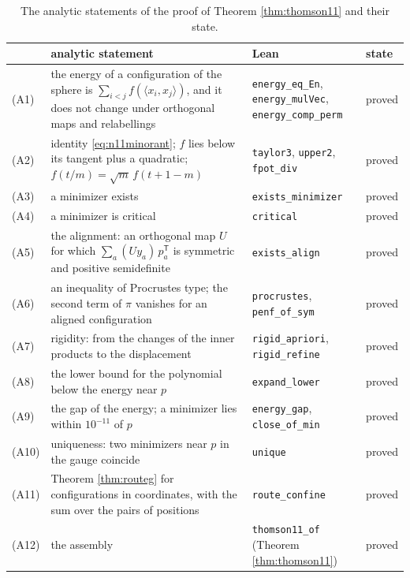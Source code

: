 \documentclass[reqno,a4paper,11pt]{amsart}
\numberwithin{equation}{section}
\newcommand{\lean}[1]{\texttt{#1}}
\begin{document}
\begin{table}[ht]
\centering
\small
\begin{tabular}{@{}lp{}p{}p{}@{}}
\toprule
 & analytic statement & Lean & state \\
\midrule
(A1) & the energy of a configuration of the sphere is $\sum_{i<j} f(\langle x_i, x_j \rangle)$, and it does not change under orthogonal maps and relabellings & \lean{energy\_eq\_En}, \newline \lean{energy\_mulVec}, \newline \lean{energy\_comp\_perm} & proved \\
(A2) & identity \eqref{eq:n11minorant}; $f$ lies below its tangent plus a quadratic; $f(t/m) = \sqrt{m} \, f(t + 1 - m)$ & \lean{taylor3}, \lean{upper2}, \newline \lean{fpot\_div} & proved \\
(A3) & a minimizer exists & \lean{exists\_minimizer} & proved \\
(A4) & a minimizer is critical & \lean{critical} & proved \\
(A5) & the alignment: an orthogonal map $U$ for which $\sum_a (U y_a) \, p_a^{\mathsf T}$ is symmetric and positive semidefinite & \lean{exists\_align} & proved \\
(A6) & an inequality of Procrustes type; the second term of $\pi$ vanishes for an aligned configuration & \lean{procrustes}, \newline \lean{penf\_of\_sym} & proved \\
(A7) & rigidity: from the changes of the inner products to the displacement & \lean{rigid\_apriori}, \newline \lean{rigid\_refine} & proved \\
(A8) & the lower bound for the polynomial below the energy near $p$ & \lean{expand\_lower} & proved \\
(A9) & the gap of the energy; a minimizer lies within $10^{-11}$ of $p$ & \lean{energy\_gap}, \newline \lean{close\_of\_min} & proved \\
(A10) & uniqueness: two minimizers near $p$ in the gauge coincide & \lean{unique} & proved \\
(A11) & Theorem \ref{thm:routeg} for configurations in coordinates, with the sum over the pairs of positions & \lean{route\_confine} & proved \\
(A12) & the assembly & \lean{thomson11\_of} \newline (Theorem \ref{thm:thomson11}) & proved \\
\bottomrule
\end{tabular}
\medskip
\caption{The analytic statements of the proof of Theorem \ref{thm:thomson11} and their state.}\label{tab:n11an}
\end{table}
\end{document}
